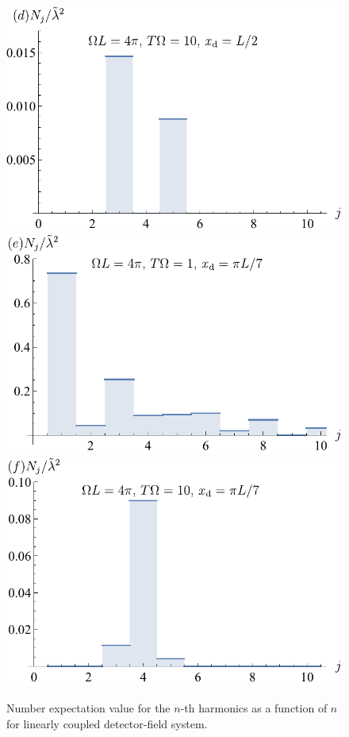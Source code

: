 \documentclass[prd,twocolumn,superscriptaddress,nofootinbib,floatfix,amsmath,amssymb]{revtex4-2}
\begin{document}
\begin{figure}[tp]
        \includegraphics[scale=0.5]{Fig7d.pdf}
        \includegraphics[scale=0.5]{Fig7e.pdf}
        \includegraphics[scale=0.5]{Fig7f.pdf}
        \caption{Number expectation value for the $n$-th harmonics as a function of $n$ for linearly coupled detector-field system.} %
        \label{fig: lineardeposit1}
    \end{figure}
    
\end{document}
